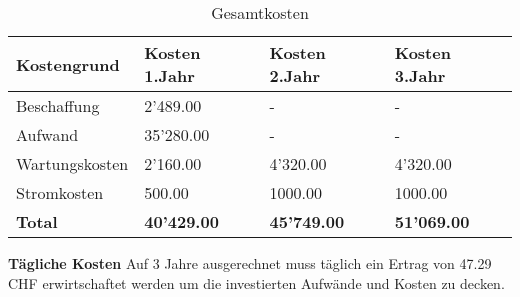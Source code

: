 \begin{table}[H]
\centering
\begin{tabular}{p{4cm}p{4cm}p{4cm}p{4cm}}
\hline
\rowcolor{heading} \textbf{Kostengrund} & \textbf{Kosten 1.Jahr} & \textbf{Kosten 2.Jahr} & \textbf{Kosten 3.Jahr}\\\hline
Beschaffung & 2'489.00 & - & - \\\hline
Aufwand & 35'280.00 & - & - \\\hline
Wartungskosten & 2'160.00 & 4'320.00 & 4'320.00 \\\hline
Stromkosten & 500.00 & 1000.00 & 1000.00 \\\hline
\rowcolor{subheading}\textbf{Total} & \textbf{40'429.00} & \textbf{45'749.00} & \textbf{51'069.00} \\\hline
\end{tabular}
\caption{Gesamtkosten}
\end{table}

\textbf{Tägliche Kosten}
Auf 3 Jahre ausgerechnet muss täglich ein Ertrag von 47.29 CHF erwirtschaftet werden um die investierten Aufwände und Kosten zu decken.

